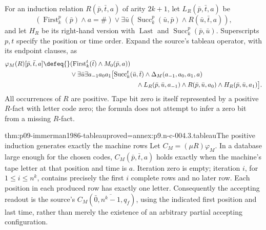 For an induction relation \(R(\bar p,\bar t,a)\) of arity \(2k+1\),
let \(L_R(\bar p,\bar t,a)\) be
\[
 (\operatorname{First}_k^p(\bar p)\land a=\#)
 \lor\exists\bar u(
    \operatorname{Succ}_k^p(\bar u,\bar p)\land R(\bar u,\bar t,a)),
\]
and let \(H_R\) be its right-hand version with \(\operatorname{Last}\)
and \(\operatorname{Succ}_k^p(\bar p,\bar u)\).
Superscripts \(p,t\) specify the position or time order.  Expand the
source's tableau operator, with its endpoint clauses, as
\[
\begin{split}
 \varphi_M(R)[\bar p,\bar t,a]\defeq{}&
 (\operatorname{First}_k^t(\bar t)\land M_0(\bar p,a))\\
 &{}\lor\exists\bar u\exists a_{-1}a_0a_1\bigl[
 \operatorname{Succ}_k^t(\bar u,\bar t)
 \land\Delta_M(a_{-1},a_0,a_1,a)\\
 &\hspace{36mm}{}\land L_R(\bar p,\bar u,a_{-1})
 \land R(\bar p,\bar u,a_0)
 \land H_R(\bar p,\bar u,a_1)\bigr].
\end{split}
\]
All occurrences of \(R\) are positive.  Tape bit zero is itself
represented by a positive \(R\)-fact with letter code zero; the
formula does not attempt to infer a zero bit from a missing \(R\)-fact.

\begin{hblemma}{thm:p09-immerman1986-tableau}{proved=annex:p9.n-c-004.3.tableau}{The positive induction generates exactly the machine rows}
Let \(C_M=(\mu R)\varphi_M\).  In a database large enough for the
chosen codes, \(C_M(\bar p,\bar t,a)\) holds exactly when the
machine's tape letter at that position and time is \(a\).
Iteration zero is empty; iteration \(i\), for \(1\leq i\leq n^k\),
contains precisely the first \(i\) complete rows and no later row.
Each position in each produced row has exactly one letter.  Consequently
the accepting readout is the source's
\(C_M(\bar0,\overline{n^k-1},q_f)\), using the indicated first
position and last time, rather than merely the existence of an arbitrary
partial accepting configuration.
\end{hblemma}


